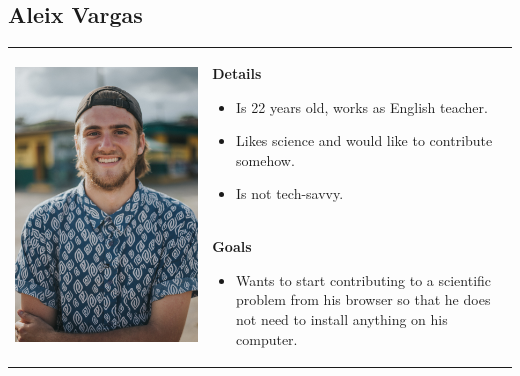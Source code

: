 \subsection*{Aleix Vargas}
\begin{table}[h]
\begin{tabular}{c p{}}
\multirow{2}{*}{
      \includegraphics[width=0.3\linewidth]{assets/images/man2.png}
} 
& 
\multicolumn{1}{p{0.7\textwidth}}{
\textbf{Details}
\begin{itemize}
	\item Is 22 years old, works as English teacher.
	\item Likes science and would like to contribute somehow.
	\item Is not tech-savvy.
\end{itemize}
} \\
&
\textbf{Goals} 
\begin{itemize}
	\item Wants to start contributing to a scientific problem from his browser so that he does not need to install anything on his computer.
\end{itemize}   
\end{tabular}
\end{table}




  
